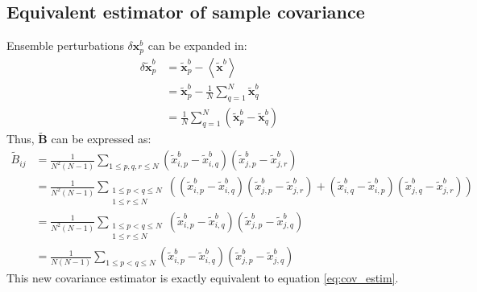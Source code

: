 \documentclass[12pt]{scrartcl}
\begin{document}
\subsection{Equivalent estimator of sample covariance}
Ensemble perturbations $\delta \mathbf{x}^b_p$ can be expanded in:
\begin{align}
\label{eq:pert_dev}
\delta \widetilde{\mathbf{x}}^b_p & = \widetilde{\mathbf{x}}^b_p - \left\langle \widetilde{\mathbf{x}}^b\right\rangle \nonumber \\
& = \widetilde{\mathbf{x}}^b_p - \frac{1}{N} \sum_{q=1}^N \widetilde{\mathbf{x}}^b_q \nonumber \\
& = \frac{1}{N} \sum_{q=1}^N \left(\widetilde{\mathbf{x}}^b_p - \widetilde{\mathbf{x}}^b_q\right)
\end{align}
Thus, $\widetilde{\mathbf{B}}$ can be expressed as:
\begin{align}
\widetilde{B}_{ij} & = \frac{1}{N^2(N-1)} \sum_{1 \le p,q,r \le N} \left(\widetilde{x}^b_{i,p} - \widetilde{x}^b_{i,q}\right) \left(\widetilde{x}^b_{j,p} - \widetilde{x}^b_{j,r}\right) \nonumber \\
& = \frac{1}{N^2(N-1)} \sum_{\substack{1 \le p < q \le N\\1 \le r \le N}} \left(\left(\widetilde{x}^b_{i,p} - \widetilde{x}^b_{i,q}\right) \left(\widetilde{x}^b_{j,p} - \widetilde{x}^b_{j,r}\right) + \left(\widetilde{x}^b_{i,q} - \widetilde{x}^b_{i,p}\right) \left(\widetilde{x}^b_{j,q} - \widetilde{x}^b_{j,r}\right)\right) \nonumber \\
& = \frac{1}{N^2(N-1)} \sum_{\substack{1 \le p < q \le N\\1 \le r \le N}} \left(\widetilde{x}^b_{i,p} - \widetilde{x}^b_{i,q}\right) \left(\widetilde{x}^b_{j,p} - \widetilde{x}^b_{j,q}\right) \nonumber \\
\label{eq:cov_estim_2}
& = \frac{1}{N(N-1)} \sum_{1 \le p < q \le N} \left(\widetilde{x}^b_{i,p} - \widetilde{x}^b_{i,q}\right) \left(\widetilde{x}^b_{j,p} - \widetilde{x}^b_{j,q}\right)
\end{align}
This new covariance estimator is exactly equivalent to equation \eqref{eq:cov_estim}.
\end{document}
